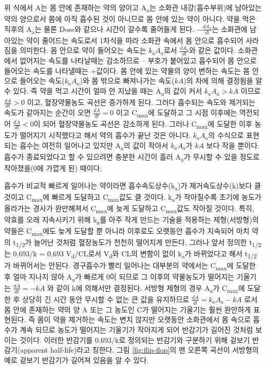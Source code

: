 \documentclass[
  11pt,
  krantz2, a4paper, twoside]{krantz}
\theoremstyle{definition}
\theoremstyle{definition}
\theoremstyle{definition}
\theoremstyle{definition}
\theoremstyle{remark}
\begin{document}
위 식에서 A는 몸 안에 존재하는 약의 양이고 A\textsubscript{a}는 소화관 내강(흡수부위)에 남아있는 약의 양으로서 몸에 아직 흡수된 것이 아니므로 몸 안에 있는 약이 아니다.
약을 먹은 직후의 A\textsubscript{a}는 물론 Dose와 같으나 시간이 갈수록 줄어들게 된다.
\(- \frac{{dA}_{a}}{{dt}}\)는 소화관에 남아있는 약이 줄어드는 속도로서 1차식을 따라 소화관 속에서 몸 안으로 흡수되어 사라짐을 의미한다.
몸 안으로 약이 들어오는 속도는 \(k_{a}A_{a}\)로서 \(\frac{{dA}_{a}}{{dt}}\)와 같은 값이다.
소화관에서 없어지는 속도를 나타날때는 감소하므로 -- 부호가 붙어있고 흡수되어 몸 안으로 들어오는 속도를 나타낼때는 +값이다. 몸 안에 있는
약물의 양이 변하는 속도는 몸 안으로 들어오는 속도(\(k_{a}A_{a}\))와 몸
밖으로 빠져나가는 속도(\({kA}\))의 차에 의해 결정됨을 알 수 있다. 즉
약을 먹고 시간이 얼마 안 지났을 때는 A\textsubscript{a}의 값이 커서 \(k_{a}A_{a} > kA\)
이므로 \(\frac{{dA}}{{dt}} > 0\) 이고, 혈장약물농도 곡선은
증가하게 된다. 그러다 흡수되는 속도와 제거되는 속도가 같아지는 순간이
오면 \(\frac{{dA}}{{dt}} = 0\) 이고 C\textsubscript{max}에 도달하고 그 시점
이후에는 역전되어 \(\frac{{dA}}{{dt}} < 0\)이 되어 혈장약물농도
곡선은 감소하게 된다. 그러나 C\textsubscript{max}에 도달한 이후 농도가 떨어지기
시작했다고 해서 약의 흡수가 끝난 것은 아니다. \(k_{a}A_{a}\)의 수식으로
표현되는 흡수는 여전히 일어나고 있지만 A\textsubscript{a}의 값이 작아서 \(k_{a}A_{a}\)가
\({kA}\) 보다 작을 뿐이다. 흡수가 종료되었다고 할 수 있으려면 충분한
시간이 흘러 A\textsubscript{a}가 무시할 수 있을 정도로 작아졌을(0에 가깝게 된) 때이다.

흡수가 비교적 빠르게 일어나는 약이라면 흡수속도상수(k\textsubscript{a})가
제거속도상수(k)보다 클 것이고 C\textsubscript{max}에 빠르게 도달하고 C\textsubscript{max}값도 클
것이다. k\textsubscript{a}가 작아질수록 초기에 농도가 올라가는 경사가 완만해져서
C\textsubscript{max}에 늦게 도달하고 C\textsubscript{max}값도 작아질 것이다. 특히, 약효를 오래 지속시키기
위해 k\textsubscript{a}를 아주 작게 만드는 기술을 적용하는 제형(서방형)의 약들은
C\textsubscript{max}에도 늦게 도달할 뿐 아니라 이후로도 오랫동안 흡수가 지속되어 마치
약의 t\textsubscript{1/2}가 늘어난 것처럼 혈장농도가 천천히 떨어지게 만든다. 그러나
앞서 정의한 t\textsubscript{1/2}는 0.693/k = 0.693 V\textsubscript{d}/CL로서 V\textsubscript{d}와 CL의 변함이 없이
k\textsubscript{a}가 바뀌었다고 해서 t\textsubscript{1/2}가 바뀌어서는 안된다. 경구흡수가 빨리
일어나는 대부분의 약에서는 C\textsubscript{max}에 도달한 후 얼마 지나지 않아 A\textsubscript{a}가
빠르게 0이 되므로 그 이후의 약물농도가 떨어지는 기울기는
\(\frac{{dA}}{{dt}} = - kA\) 와 같이 k에 의해서만 결정된다.
서방형 제형의 경우 A\textsubscript{a}가 C\textsubscript{max}에 도달한 후 상당히 긴 시간 동안 무시할
수 없는 큰 값을 유지하므로
\(\frac{{dA}}{{dt}} = k_{a}A_{a} - kA\) 로서 몸 안에 존재하는
약의 양 A 또는 그 농도인 C가 떨어지는 기울기는 훨씬 완만하게 표현된다.
즉 몸이 약을 제거하는 속도는 변치 않지만 오랫동안 소화관에서 몸 속으로
흡수가 계속 되므로 농도가 떨어지는 기울기가 작아지게 되어 반감기가
길어진 것처럼 보이는 것이다. 이러한 반감기를 0.693/k로 정의되는 반감기와
구분하기 위해 겉보기 반감기(apparent half-life)라고 칭한다. 그림 \ref{fig:flip-flop}의
맨 오른쪽 곡선이 서방형의 예로 겉보기 반감기가 길어져 있음을 알 수 있다.
\end{document}

